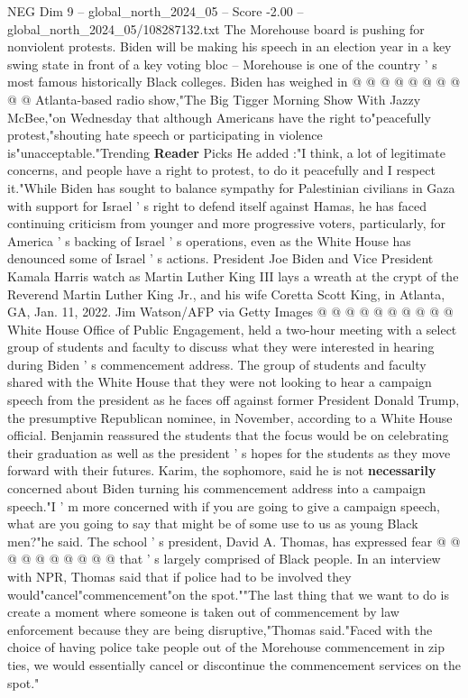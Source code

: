 \begin{textsample}{NEG Dim 9 – global\_north\_2024\_05 – Score -2.00 – global\_north\_2024\_05/108287132.txt}
The Morehouse board is pushing for nonviolent protests.
Biden will be making his speech in an election year in a key swing state in front of a key voting bloc -- Morehouse is one of the country ' s most famous historically Black colleges.
Biden has weighed in @ @ @ @ @ @ @ @ @ @ Atlanta-based radio show,"The Big Tigger Morning Show With Jazzy McBee,"on Wednesday that although Americans have the right to"peacefully protest,"shouting hate speech or participating in violence is"unacceptable."Trending \textbf{Reader} Picks He added :"I think, a lot of legitimate concerns, and people have a right to protest, to do it peacefully and I respect it."While Biden has sought to balance sympathy for Palestinian civilians in Gaza with support for Israel ' s right to defend itself against Hamas, he has faced continuing criticism from younger and more progressive voters, particularly, for America ' s backing of Israel ' s operations, even as the White House has denounced some of Israel ' s actions.
President Joe Biden and Vice President Kamala Harris watch as Martin Luther King III lays a wreath at the crypt of the Reverend Martin Luther King Jr., and his wife Coretta Scott King, in Atlanta, GA, Jan. 11, 2022.
Jim Watson/AFP via Getty Images @ @ @ @ @ @ @ @ @ @ White House Office of Public Engagement, held a two-hour meeting with a select group of students and faculty to discuss what they were interested in hearing during Biden ' s commencement address.
The group of students and faculty shared with the White House that they were not looking to hear a campaign speech from the president as he faces off against former President Donald Trump, the presumptive Republican nominee, in November, according to a White House official.
Benjamin reassured the students that the focus would be on celebrating their graduation as well as the president ' s hopes for the students as they move forward with their futures.
Karim, the sophomore, said he is not \textbf{necessarily} concerned about Biden turning his commencement address into a campaign speech."I ' m more concerned with if you are going to give a campaign speech, what are you going to say that might be of some use to us as young Black men?"he said.
The school ' s president, David A.
Thomas, has expressed fear @ @ @ @ @ @ @ @ @ @ that ' s largely comprised of Black people.
In an interview with NPR, Thomas said that if police had to be involved they would"cancel"commencement"on the spot.""The last thing that we want to do is create a moment where someone is taken out of commencement by law enforcement because they are being disruptive,"Thomas said."Faced with the choice of having police take people out of the Morehouse commencement in zip ties, we would essentially cancel or discontinue the commencement services on the spot."

\end{textsample}
